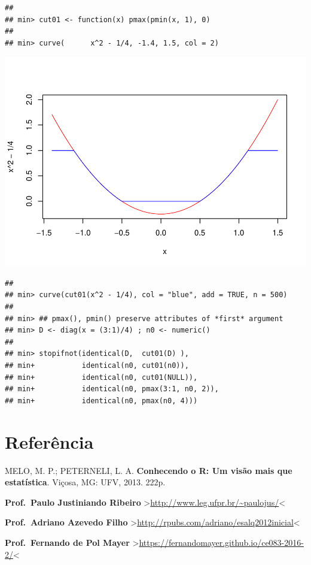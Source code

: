 \documentclass[]{book}
\begin{document}
\begin{verbatim}
## 
## min> cut01 <- function(x) pmax(pmin(x, 1), 0)
## 
## min> curve(      x^2 - 1/4, -1.4, 1.5, col = 2)
\end{verbatim}

\includegraphics{TudodoR_files/figure-latex/unnamed-chunk-14-2.pdf}

\begin{verbatim}
## 
## min> curve(cut01(x^2 - 1/4), col = "blue", add = TRUE, n = 500)
## 
## min> ## pmax(), pmin() preserve attributes of *first* argument
## min> D <- diag(x = (3:1)/4) ; n0 <- numeric()
## 
## min> stopifnot(identical(D,  cut01(D) ),
## min+           identical(n0, cut01(n0)),
## min+           identical(n0, cut01(NULL)),
## min+           identical(n0, pmax(3:1, n0, 2)),
## min+           identical(n0, pmax(n0, 4)))
\end{verbatim}

\hypertarget{referencia}{%
\section{Referência}\label{referencia}}

MELO, M. P.; PETERNELI, L. A. \textbf{Conhecendo o R: Um visão mais que estatística}. Viçosa, MG: UFV, 2013. 222p.

\textbf{Prof.~Paulo Justiniando Ribeiro} \textgreater{}\url{http://www.leg.ufpr.br/~paulojus/}\textless{}

\textbf{Prof.~Adriano Azevedo Filho} \textgreater{}\url{http://rpubs.com/adriano/esalq2012inicial}\textless{}

\textbf{Prof.~Fernando de Pol Mayer} \textgreater{}\url{https://fernandomayer.github.io/ce083-2016-2/}\textless{}
\end{document}
